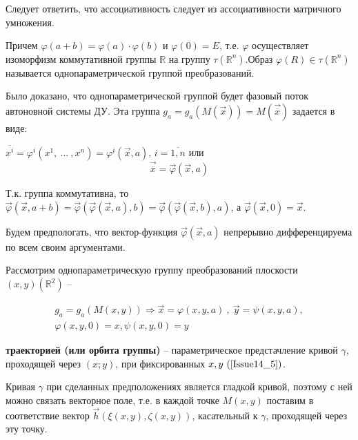 Следует ответить, что ассоциативность следует из ассоциативности матричного умножения.

Причем $\varphi(a+b) = \varphi(a)\cdot \varphi(b)$ и $\varphi(0) = E$, т.е. $\varphi$ осуществляет изоморфизм коммутативной группы $\mathbb{R}$ на группу $\tau(\mathbb{R}^n)$.Образ $\varphi(R) \in \tau(\mathbb{R}^n)$ называется однопараметрической группой преобразований.

Было доказано, что однопараметрической группой будет фазовый поток автоновной системы ДУ. Эта группа $g_a = g_a(M(\vec{x})) = M(\overrightarrow{\overline{x}})$ задается в виде:

$\overline{x^i} = \varphi^i(x^1,\ \dots\ ,x^n) = \varphi^i(\vec{x}, a)$, $i = \overline{1, n}$ или 
\begin{equation}
	\overrightarrow{\overline{x}} = \vec{\varphi}(\vec{x}, a)
	\label{Issue14_4}
\end{equation}

Т.к. группа коммутативна, то $\vec{\varphi}(\vec{x}, a + b) = \vec{\varphi}(\vec{\varphi}(\vec{x}, a), b) = \vec{\varphi}(\vec{\varphi}(\vec{x}, b), a)$, а $\vec{\varphi}(\vec{x}, 0) = \vec{x}$.

Будем предпологать, что вектор-функция $\vec{\varphi}(\vec{x}, a)$ непрерывно дифференцируема по всем своим аргументами.

Рассмотрим однопараметрическую группу преобразований плоскости $(x,y)(\mathbb{R}^2)$ --

\begin{equation}
	\begin{gathered}
		g_a = g_a(M(x,y)) \Rightarrow \vec{x} = \varphi(x,y,a)\ ,\ \vec{y} = \psi(x,y,a),\\
		\varphi(x,y,0) = x, \psi(x,y,0) = y
	\end{gathered}	
	\label{Issue14_5}
\end{equation}


\begin{definition}

\textbf{траекторией (или орбита группы)} -- параметрическое предстачление кривой $\gamma$, проходящей через $(x;y)$, при фиксированных $x,y\ (\ref{Issue14_5})$.

\end{definition}


Кривая $\gamma$ при сделанных предположениях является $\textbf{гладкой кривой}$, поэтому с ней можно связать векторное поле, т.е. в каждой точке $M(x,y)$ поставим в соответствие вектор $\vec{h}(\xi(x,y), \zeta(x,y))$, касательный к $\gamma$, проходящей через эту точку.

